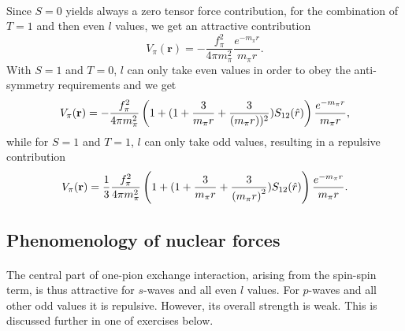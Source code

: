\documentclass[%
twoside,                 %
final,                   %
10pt]{article}
\begin{document}
\paragraph{}
Since $S=0$ yields always a zero tensor force contribution, for the combination of $T=1$ and then even $l$ values, we get an attractive contribution
\[
V_{\pi}(\mathbf{r})=-\frac{f_{\pi}^{2}}{4\pi m_{\pi}^{2}}\frac{e^{-m_\pi r}}{m_\pi r}.
\]
With $S=1$ and $T=0$, $l$ can only take even values in order to obey the anti-symmetry requirements and we get
\[
V_{\pi}(\mathbf{r})= -\frac{f_{\pi}^{2}}{4\pi m_{\pi}^{2}}
\left(1+( 1 + {3\over m_\pi r} + {3\over\left(m_\pi r\right))^2}) S_{12} (\hat r)\right) \frac{e^{-m_\pi r}}{m_\pi r},
\]
while for $S=1$ and $T=1$, $l$ can only take odd values, resulting in a repulsive contribution 
\[
V_{\pi}(\mathbf{r})= \frac{1}{3}\frac{f_{\pi}^{2}}{4\pi m_{\pi}^{2}}\left(1+( 1 + {3\over m_\pi r} + {3\over\left(m_\pi r\right)^2}) S_{12} (\hat r)\right) \frac{e^{-m_\pi r}}{m_\pi r}.
\]



\subsection*{Phenomenology of nuclear forces}

\paragraph{}

The central part of one-pion exchange interaction, arising from the spin-spin term,  
is thus attractive for $s$-waves and all even $l$ values. For $p$-waves and all other odd values
it is repulsive. However, its overall strength is weak. This is discussed further in one of exercises below.









\printindex
\end{document}

